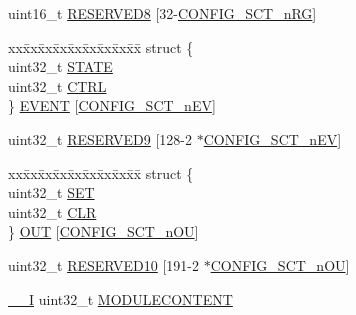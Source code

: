 \begin{DoxyCompactItemize}
\begin{tabbing}
\end{tabbing}\item 
uint16\+\_\+t \hyperlink{struct_l_p_c___s_c_t___t_a997c0a13cc0ccf7886f11696ba5b306f}{R\+E\+S\+E\+R\+V\+E\+D8} \mbox{[}32-\/\hyperlink{group___s_c_t__18_x_x__43_x_x_ga8d80e251208a01483a6b00c81ecb7493}{C\+O\+N\+F\+I\+G\+\_\+\+S\+C\+T\+\_\+n\+RG}\mbox{]}
\item 
\begin{tabbing}
xx\=xx\=xx\=xx\=xx\=xx\=xx\=xx\=xx\=\kill
struct \{\\
\>uint32\_t \hyperlink{struct_l_p_c___s_c_t___t_a7e62b5ac1947a8e2611996e0846f8c01}{STATE}\\
\>uint32\_t \hyperlink{struct_l_p_c___s_c_t___t_a3be6514ca3bd369fd0de9f8f49471179}{CTRL}\\
\} \hyperlink{struct_l_p_c___s_c_t___t_a3d4559423db3c3be859ed103acff4b67}{EVENT} \mbox{[}\hyperlink{group___s_c_t__18_x_x__43_x_x_ga2672a9e7fb27a28b4f2dd7f4468f0010}{CONFIG\_SCT\_nEV}\mbox{]}\\

\end{tabbing}\item 
uint32\+\_\+t \hyperlink{struct_l_p_c___s_c_t___t_a31c21ff0f08363ff8bf00ece210e7a1c}{R\+E\+S\+E\+R\+V\+E\+D9} \mbox{[}128-\/2 $\ast$\hyperlink{group___s_c_t__18_x_x__43_x_x_ga2672a9e7fb27a28b4f2dd7f4468f0010}{C\+O\+N\+F\+I\+G\+\_\+\+S\+C\+T\+\_\+n\+EV}\mbox{]}
\item 
\begin{tabbing}
xx\=xx\=xx\=xx\=xx\=xx\=xx\=xx\=xx\=\kill
struct \{\\
\>uint32\_t \hyperlink{struct_l_p_c___s_c_t___t_aeae4bcc387d26703db6e5e8e5aa26ae9}{SET}\\
\>uint32\_t \hyperlink{struct_l_p_c___s_c_t___t_a15547ec8f9217998441e30b252c9814d}{CLR}\\
\} \hyperlink{struct_l_p_c___s_c_t___t_a07d977354dcec3c39a45dfcd21c4d785}{OUT} \mbox{[}\hyperlink{group___s_c_t__18_x_x__43_x_x_gab432d85ccb09a5c5d232916c8bb95089}{CONFIG\_SCT\_nOU}\mbox{]}\\

\end{tabbing}\item 
uint32\+\_\+t \hyperlink{struct_l_p_c___s_c_t___t_a4be0af0057feabb08d798793765e5e93}{R\+E\+S\+E\+R\+V\+E\+D10} \mbox{[}191-\/2 $\ast$\hyperlink{group___s_c_t__18_x_x__43_x_x_gab432d85ccb09a5c5d232916c8bb95089}{C\+O\+N\+F\+I\+G\+\_\+\+S\+C\+T\+\_\+n\+OU}\mbox{]}
\item 
\hyperlink{core__sc300_8h_af63697ed9952cc71e1225efe205f6cd3}{\+\_\+\+\_\+I} uint32\+\_\+t \hyperlink{struct_l_p_c___s_c_t___t_ae669313e491358d3345b272b8571dd16}{M\+O\+D\+U\+L\+E\+C\+O\+N\+T\+E\+NT}
\end{DoxyCompactItemize}



